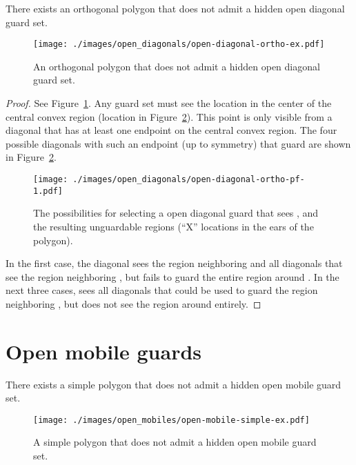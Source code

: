 \documentclass{cccg12}
\begin{document}
\begin{lemma}
There exists an orthogonal polygon that does not admit a hidden open diagonal guard set.
\end{lemma}

\begin{figure}[ht]
\centering
\texttt{[image: ./images/open\_diagonals/open-diagonal-ortho-ex.pdf]}
\caption{An orthogonal polygon that does not admit a hidden open diagonal guard set.}
\label{fig:open-diagonal-ortho-ex}
\end{figure}

\begin{proof}
See Figure~\ref{fig:open-diagonal-ortho-ex}.
Any guard set must see the location in the center of the central convex region (location  in Figure~\ref{fig:open-diagonal-ortho-pf-1}).
This point is only visible from a diagonal that has at least one endpoint on the central convex region.
The four possible diagonals with such an endpoint (up to symmetry) that guard  are shown in Figure~\ref{fig:open-diagonal-ortho-pf-1}.

\begin{figure}[ht]
\centering
\texttt{[image: ./images/open\_diagonals/open-diagonal-ortho-pf-1.pdf]}
\caption{The possibilities for selecting a open diagonal guard that sees , and the resulting unguardable regions (``X'' locations in the ears of the polygon).}
\label{fig:open-diagonal-ortho-pf-1}
\end{figure}

In the first case, the diagonal sees the region neighboring  and all diagonals that see the region neighboring , but fails to guard the entire region around .
In the next three cases,  sees all diagonals that could be used to guard the region neighboring , but does not see the region around  entirely.
\end{proof}

\section{Open mobile guards}
\label{sec:open-mobiles}

\begin{lemma}
There exists a simple polygon that does not admit a hidden open mobile guard set.
\end{lemma}

\begin{figure}[ht]
\centering
\texttt{[image: ./images/open\_mobiles/open-mobile-simple-ex.pdf]}
\caption{A simple polygon that does not admit a hidden open mobile guard set.}
\label{fig:open-mobile-simple-ex}
\end{figure}
\end{document}
